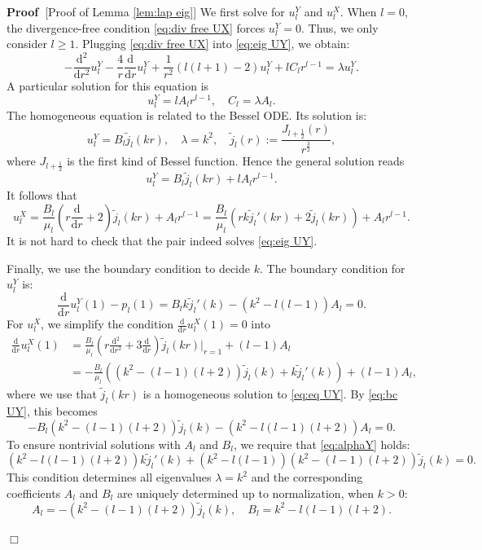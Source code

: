 \documentclass[11pt,a4paper]{article}
\numberwithin{equation}{section}
\newcommand{\assign}{:=}
\newcommand{\mathd}{\mathrm{d}}
\newenvironment{proof}{\noindent\textbf{Proof\ }}{\hspace*{\fill}$\Box$\medskip}
\begin{document}
\begin{proof}[Proof of Lemma \ref{lem:lap eig}]
  We first solve for $u_l^Y$ and $u_l^X$. When $l = 0$, the divergence-free
  condition \eqref{eq:div free UX} forces $u^Y_l = 0$. Thus, we only consider
  $l \geqslant 1$. Plugging \eqref{eq:div free UX} into \eqref{eq:eig UY}, we
  obtain:
  \begin{equation}
    - \frac{\mathd^2}{\mathd r^2} u_l^Y - \frac{4}{r}  \frac{\mathd}{\mathd r}
    u_l^Y + \frac{1}{r^2}  (l (l + 1) - 2) u_l^Y + lC_l r^{l - 1} = \lambda
    u_l^Y . \label{eq:eq UY}
  \end{equation}
  A particular solution for this equation is
  \[ u_l^Y = lA_l r^{l - 1}, \quad C_l = \lambda A_l . \]
  The homogeneous equation is related to the Bessel ODE. Its solution is:
  \[ u_l^Y = B_l  \tilde{j}_l  (kr), \quad \lambda = k^2, \quad \tilde{j}_l
     (r) \assign \frac{J_{l + \frac{1}{2}} (r)}{r^{\frac{3}{2}}}, \]
  where $J_{l + \frac{1}{2}}$ is the first kind of Bessel function. Hence the
  general solution reads
  \[ u_l^Y = B_l  \tilde{j}_l  (kr) + lA_l r^{l - 1} . \]
  It follows that
  \[ u_l^X = \frac{B_l}{\mu_l}  \left( r \frac{\mathd}{\mathd r} + 2 \right) 
     \tilde{j}_l  (kr) + A_l r^{l - 1} = \frac{B_l}{\mu_l}  (rk \tilde{j}_l'
     (kr) + 2 \tilde{j}_l (kr)) + A_l r^{l - 1} . \]
  It is not hard to check that the pair indeed solves \eqref{eq:eig UY}.
  
  Finally, we use the boundary condition to decide $k$. The boundary
  condition for $u_l^Y$ is:
  \begin{equation}
    \frac{\mathd}{\mathd r} u_l^Y (1) - p_l (1) = B_l k \tilde{j}_l' (k) -
    (k^2 - l (l - 1)) A_l = 0. \label{eq:bc UY}
  \end{equation}
  For $u_l^X$, we simplify the condition $\frac{\mathd}{\mathd r} u_l^X (1) =
  0$ into
  \[ \begin{aligned}
       \frac{\mathd}{\mathd r} u_l^X (1) & = \frac{B_l}{\mu_l}  \left( r
       \frac{\mathd^2}{\mathd r^2} + 3 \frac{\mathd}{\mathd r} \right) 
       \tilde{j}_l  (kr) |_{r = 1} + (l - 1) A_l\\
       & = - \frac{B_l}{\mu_l}  ((k^2 - (l - 1) (l + 2)) \tilde{j}_l (k) + k
       \tilde{j}_l' (k)) + (l - 1) A_l,
     \end{aligned} \]
  where we use that $\tilde{j}_l  (kr)$ is a homogeneous solution to
  \eqref{eq:eq UY}. By \eqref{eq:bc UY}, this becomes
  \[ - B_l  (k^2 - (l - 1) (l + 2))  \tilde{j}_l (k) - (k^2 - l (l - 1) (l +
     2)) A_l = 0. \]
  To ensure nontrivial solutions with $A_l$ and $B_l$, we require that
  \eqref{eq:alphaY} holds:
  \begin{equation}
    (k^2 - l (l - 1) (l + 2)) k \tilde{j}_l' (k) + (k^2 - l (l - 1))  (k^2 -
    (l - 1) (l + 2))  \tilde{j}_l (k) = 0.
  \end{equation}
  This condition determines all eigenvalues $\lambda = k^2$ and the
  corresponding coefficients $A_l$ and $B_l$ are uniquely determined up to
  normalization, when $k>0$:
  \[ A_l = - (k^2 - (l - 1) (l + 2))  \tilde{j}_l (k), \quad B_l = k^2 - l (l
     - 1)  (l + 2) . \]
  

\end{proof}
\end{document}
